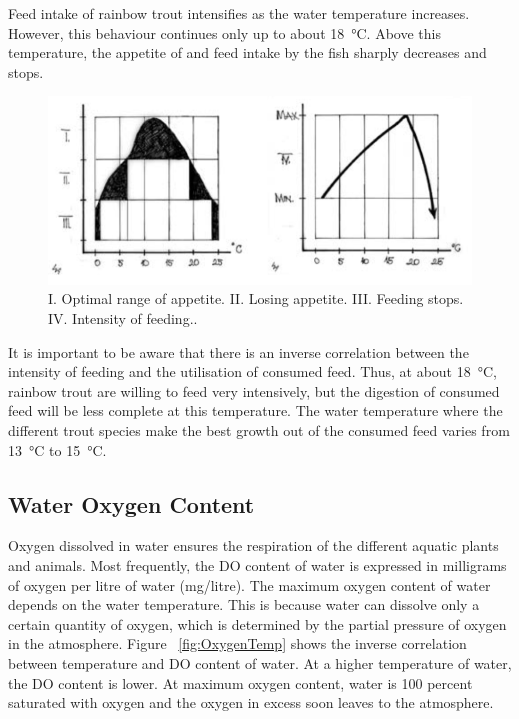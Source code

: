 Feed intake of rainbow trout intensifies as the water temperature increases. However, this behaviour continues only up to about \SI{18}{\celsius}.  Above this temperature, the appetite of and feed intake by the fish sharply decreases and stops.

\begin{figure}[H]
  \centering
   \includegraphics[scale = 0.5]{images/OptimalAppetite.png}
  \caption{ I. Optimal range of appetite. II. Losing appetite. III. Feeding stops. IV. Intensity of feeding..}
   \label{fig:OptimalAppetite}
\end{figure}

It is important to be aware that there is an inverse correlation between the intensity of feeding and the utilisation of consumed feed. Thus, at about \SI{18}{\celsius}, rainbow trout are willing to feed very intensively, but the digestion of consumed feed will be less complete at this temperature. The water temperature where the different trout species make the best growth out of the consumed feed varies from \SI{13}{\celsius} to \SI{15}{ \celsius}. 

\subsection{Water Oxygen Content}

Oxygen dissolved in water ensures the respiration of the different aquatic plants and animals. 
Most frequently, the DO content of water is expressed in milligrams of oxygen per litre of water (mg/litre).
The maximum oxygen content of water depends on the water temperature. 
This is because water can dissolve only a certain quantity of oxygen, which is determined by the partial pressure of oxygen in the atmosphere.
Figure ~\ref{fig:OxygenTemp} shows the inverse correlation between temperature and DO content of water. 
At a higher temperature of water, the DO content is lower. 
At maximum oxygen content, water is 100 percent saturated with oxygen and the oxygen in excess soon leaves to the atmosphere.


